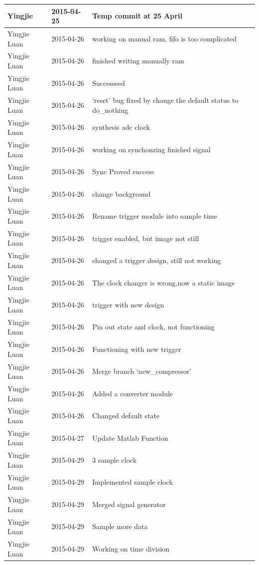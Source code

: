 \documentclass[11pt]{scrartcl}
\begin{document}
\begin{longtable}{@{\extracolsep{\fill}}lll@{}}
Yingjie & 2015-04-25 & Temp commit at 25 April \\ \hline
Yingjie Luan & 2015-04-26 & working on manual ram, fifo is too complicated \\ \hline
Yingjie Luan & 2015-04-26 & finished writing manually ram \\ \hline
Yingjie Luan & 2015-04-26 & Successeed \\ \hline
Yingjie Luan & 2015-04-26 & `reset' bug fixed by change the default status to do\_nothing \\ \hline
Yingjie Luan & 2015-04-26 & synthesis adc clock \\ \hline
Yingjie Luan & 2015-04-26 & working on synchonzing finished signal \\ \hline
Yingjie Luan & 2015-04-26 & Sync Proved success \\ \hline
Yingjie Luan & 2015-04-26 & change background \\ \hline
Yingjie Luan & 2015-04-26 & Rename trigger module into sample time \\ \hline
Yingjie Luan & 2015-04-26 & trigger enabled, but image not still \\ \hline
Yingjie Luan & 2015-04-26 & changed a trigger design, still not working \\ \hline
Yingjie Luan & 2015-04-26 & The clock changer is wrong,now a static image \\ \hline
Yingjie Luan & 2015-04-26 & trigger with new design \\ \hline
Yingjie Luan & 2015-04-26 & Pin out state and clock, not functioning \\ \hline
Yingjie Luan & 2015-04-26 & Functioning with new trigger \\ \hline
Yingjie Luan & 2015-04-26 & Merge branch `new\_compressor' \\ \hline
Yingjie Luan & 2015-04-26 & Added a converter module \\ \hline
Yingjie Luan & 2015-04-26 & Changed default state \\ \hline
Yingjie Luan & 2015-04-27 & Update Matlab Function \\ \hline
Yingjie Luan & 2015-04-29 & 3 sample clock \\ \hline
Yingjie Luan & 2015-04-29 & Implemented sample clock \\ \hline
Yingjie Luan & 2015-04-29 & Merged signal generator \\ \hline
Yingjie Luan & 2015-04-29 & Sample more data \\ \hline
Yingjie Luan & 2015-04-29 & Working on time division \\ \hline

\end{longtable}
\end{document}
